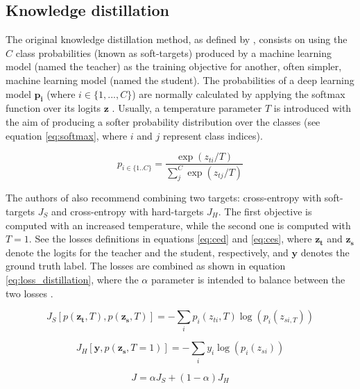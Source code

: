 \subsection{Knowledge distillation} \label{sec:distillation_kd}
The original knowledge distillation method, as defined by \autocite{hinton2015}, consists on using the $C$ class probabilities (known as soft-targets) produced by a machine learning model (named the teacher) as the training objective for another, often simpler, machine learning model (named the student). The probabilities of a deep learning model $\mathbf{p_i}$ (where $i \in \{1,...,C\}$) are normally calculated by applying the softmax function over its logits $\mathbf{z}$ \autocite{Goodfellow2016}. Usually, a temperature parameter $T$ is introduced with the aim of producing a softer probability distribution over the classes (see equation \ref{eq:softmax}, where $i$ and $j$ represent class indices).

\begin{equation}
p_{i \in \{1 .. C\}} = \frac{\exp(z_{ti}/T)}{\sum_j^C \exp(z_{tj}/T)}
\label{eq:softmax}
\end{equation}

The authors of \autocite{hinton2015} also recommend combining two targets: cross-entropy with soft-targets $J_S$ and cross-entropy with hard-targets  $J_H$. The first objective is computed with an increased temperature, while the second one is computed with $T=1$. See the losses definitions in equations \ref{eq:ced} and \ref{eq:ces}, where $\mathbf{z_t}$ and $\mathbf{z_s}$ denote the logits for the teacher and the student, respectively, and $\mathbf{y}$ denotes the ground truth label. The losses are combined as shown in equation \ref{eq:loss_distillation}, where the $\alpha$ parameter is intended to balance between the two losses \autocite{gou2020}.

\begin{equation}
J_S\left[p( \mathbf{z_t}, T), p(\mathbf{z_s}, T) \right] = -\sum_i p_i(z_{ti}, T) \log \left(p_i(z_{si, T})\right)
\label{eq:ced}
\end{equation}

\begin{equation}
J_{H}\left[\mathbf{y}, p(\mathbf{z_s}, T=1) \right] = -\sum_i y_i \log \left(p_i(z_{si})\right)
\label{eq:ces}
\end{equation}

\begin{equation}
J = \alpha J_S + (1-\alpha) J_{H}
\label{eq:loss_distillation}
\end{equation}

